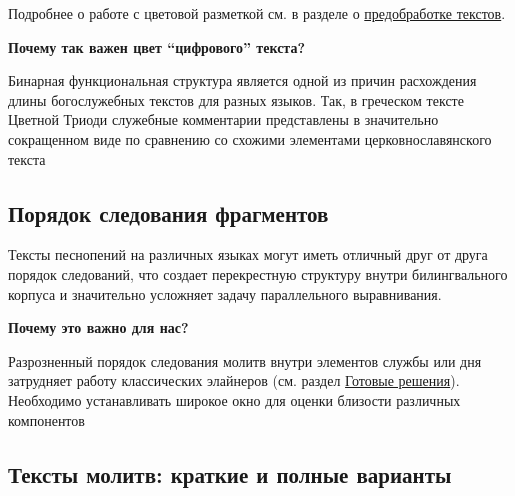 \documentclass[
  letterpaper,
]{book}
\begin{document}
Подробнее о работе с цветовой разметкой см. в разделе о
\protect\hyperlink{sec-html_color}{предобработке текстов}.

\begin{tcolorbox}[enhanced jigsaw, toprule=.15mm, colframe=quarto-callout-note-color-frame, colback=white, left=2mm, arc=.35mm, leftrule=.75mm, bottomrule=.15mm, rightrule=.15mm, opacityback=0, breakable]

\textbf{Почему так важен цвет ``цифрового'' текста?}\vspace{2mm}

Бинарная функциональная структура является одной из причин расхождения
длины богослужебных текстов для разных языков. Так, в греческом тексте
Цветной Триоди служебные комментарии представлены в значительно
сокращенном виде по сравнению со схожими элементами церковнославянского
текста

\end{tcolorbox}

\hypertarget{sec-element_order}{%
\subsection{Порядок следования фрагментов}\label{sec-element_order}}

Тексты песнопений на различных языках могут иметь отличный друг от друга
порядок следований, что создает перекрестную структуру внутри
билингвального корпуса и значительно усложняет задачу параллельного
выравнивания.

\begin{tcolorbox}[enhanced jigsaw, toprule=.15mm, colframe=quarto-callout-note-color-frame, colback=white, left=2mm, arc=.35mm, leftrule=.75mm, bottomrule=.15mm, rightrule=.15mm, opacityback=0, breakable]

\textbf{Почему это важно для нас?}\vspace{2mm}

Разрозненный порядок следования молитв внутри элементов службы или дня
затрудняет работу классических элайнеров (см. раздел
\protect\hyperlink{sec-about_aligners}{Готовые решения}). Необходимо
устанавливать широкое окно для оценки близости различных компонентов

\end{tcolorbox}

\hypertarget{sec-full_or_abridged_hymns}{%
\subsection{Тексты молитв: краткие и полные
варианты}\label{sec-full_or_abridged_hymns}}
\end{document}
